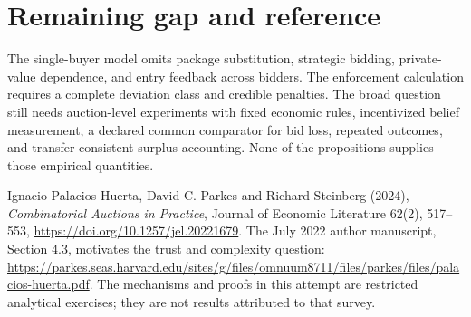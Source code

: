 \documentclass[11pt,a4paper]{article}
\theoremstyle{definition}
\theoremstyle{remark}
\begin{document}
\section{Remaining gap and reference}
The single-buyer model omits package substitution, strategic bidding, private-value dependence, and entry feedback across bidders. The enforcement calculation requires a complete deviation class and credible penalties. The broad question still needs auction-level experiments with fixed economic rules, incentivized belief measurement, a declared common comparator for bid loss, repeated outcomes, and transfer-consistent surplus accounting. None of the propositions supplies those empirical quantities.

Ignacio Palacios-Huerta, David C. Parkes and Richard Steinberg (2024), \emph{Combinatorial Auctions in Practice}, Journal of Economic Literature 62(2), 517--553, \url{https://doi.org/10.1257/jel.20221679}. The July 2022 author manuscript, Section 4.3, motivates the trust and complexity question: \url{https://parkes.seas.harvard.edu/sites/g/files/omnuum8711/files/parkes/files/palacios-huerta.pdf}. The mechanisms and proofs in this attempt are restricted analytical exercises; they are not results attributed to that survey.
\end{document}
